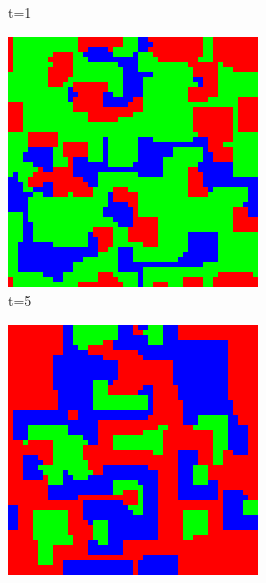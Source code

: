 \documentclass[a4paper, 11pt]{article}
\begin{document}
\begin{landscape}
\begin{figure}[H]
\begin{subfigure}{.20\textwidth}
  \caption{t=1}
\end{subfigure}%
\begin{subfigure}{.20\textwidth}
  \centering
  \includegraphics[width=0.95\linewidth]{ROCK_PAPER_SCISSORS_MOORE_50x50_HighRockPop_t05}
  \caption{t=5}
\end{subfigure}%
\begin{subfigure}{.20\textwidth}
  \centering
  \includegraphics[width=0.95\linewidth]{ROCK_PAPER_SCISSORS_MOORE_50x50_HighRockPop_t10}

\end{subfigure}
\end{figure}
\end{landscape}
\end{document}
